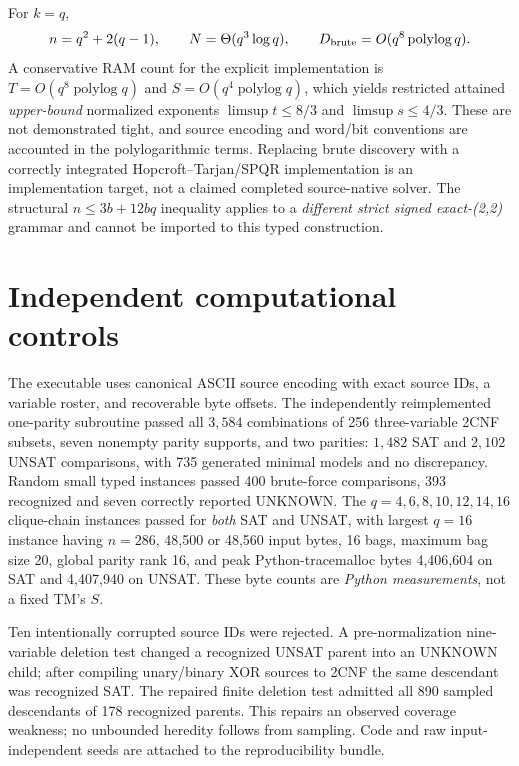 \documentclass[10pt]{article}
\begin{document}
For $k=q$,
\[
 n=q^2+2(q-1),\qquad N=\Theta(q^3\log q),\qquad
 D_{\rm brute}=O(q^8\operatorname{polylog}q).
\]
A conservative RAM count for the explicit implementation is $T=O(q^8\operatorname{polylog}q)$ and $S=O(q^4\operatorname{polylog}q)$, which yields restricted attained \emph{upper-bound} normalized exponents $\limsup t\le8/3$ and $\limsup s\le4/3$. These are not demonstrated tight, and source encoding and word/bit conventions are accounted in the polylogarithmic terms. Replacing brute discovery with a correctly integrated Hopcroft--Tarjan/SPQR implementation is an implementation target, not a claimed completed source-native solver. The structural $n\le3b+12bq$ inequality applies to a \emph{different strict signed exact-(2,2)} grammar and cannot be imported to this typed construction.

\section{Independent computational controls}
The executable uses canonical ASCII source encoding with exact source IDs, a variable roster, and recoverable byte offsets. The independently reimplemented one-parity subroutine passed all $3,584$ combinations of 256 three-variable 2CNF subsets, seven nonempty parity supports, and two parities: $1,482$ SAT and $2,102$ UNSAT comparisons, with 735 generated minimal models and no discrepancy. Random small typed instances passed 400 brute-force comparisons, 393 recognized and seven correctly reported UNKNOWN. The $q=4,6,8,10,12,14,16$ clique-chain instances passed for \emph{both} SAT and UNSAT, with largest $q=16$ instance having $n=286$, 48,500 or 48,560 input bytes, 16 bags, maximum bag size 20, global parity rank 16, and peak Python-tracemalloc bytes 4,406,604 on SAT and 4,407,940 on UNSAT. These byte counts are \emph{Python measurements}, not a fixed TM's $S$.

Ten intentionally corrupted source IDs were rejected. A pre-normalization nine-variable deletion test changed a recognized UNSAT parent into an UNKNOWN child; after compiling unary/binary XOR sources to 2CNF the same descendant was recognized SAT. The repaired finite deletion test admitted all 890 sampled descendants of 178 recognized parents. This repairs an observed coverage weakness; no unbounded heredity follows from sampling. Code and raw input-independent seeds are attached to the reproducibility bundle.
\end{document}
